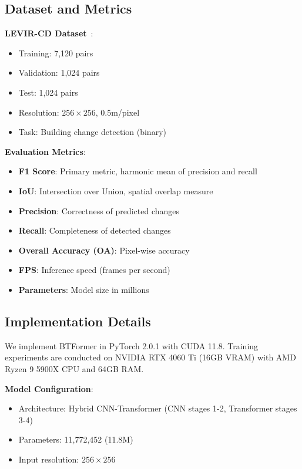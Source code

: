 \documentclass[journal]{IEEEtran}
\begin{document}
\subsection{Dataset and Metrics}

\textbf{LEVIR-CD Dataset}~\cite{bandara2022transformer}:
\begin{itemize}
    \item Training: 7,120 pairs
    \item Validation: 1,024 pairs
    \item Test: 1,024 pairs
    \item Resolution: $256 \times 256$, 0.5m/pixel
    \item Task: Building change detection (binary)
\end{itemize}

\textbf{Evaluation Metrics}:
\begin{itemize}
    \item \textbf{F1 Score}: Primary metric, harmonic mean of precision and recall
    \item \textbf{IoU}: Intersection over Union, spatial overlap measure
    \item \textbf{Precision}: Correctness of predicted changes
    \item \textbf{Recall}: Completeness of detected changes
    \item \textbf{Overall Accuracy (OA)}: Pixel-wise accuracy
    \item \textbf{FPS}: Inference speed (frames per second)
    \item \textbf{Parameters}: Model size in millions
\end{itemize}

\subsection{Implementation Details}

We implement BTFormer in PyTorch 2.0.1 with CUDA 11.8. Training experiments are conducted on NVIDIA RTX 4060 Ti (16GB VRAM) with AMD Ryzen 9 5900X CPU and 64GB RAM.

\textbf{Model Configuration}:
\begin{itemize}
    \item Architecture: Hybrid CNN-Transformer (CNN stages 1-2, Transformer stages 3-4)
    \item Parameters: 11,772,452 (11.8M)
    \item Input resolution: $256 \times 256$
\end{itemize}
\end{document}
